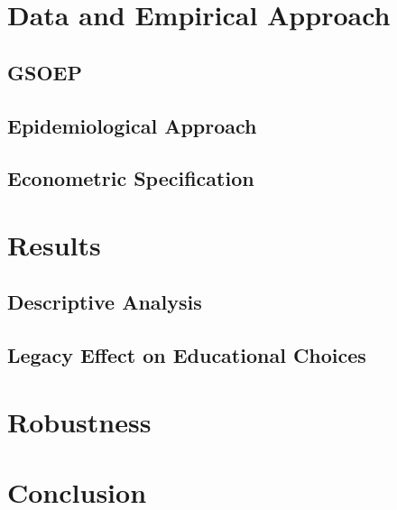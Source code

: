 \documentclass[a4paper, oneside, hyperfootnotes = false]{article}
\begin{document}
{\section{Data and Empirical Approach}
\label{dataemp}

\subsection{GSOEP}
\label{gsoep}

\subsection{Epidemiological Approach}
\label{epid}

\subsection{Econometric Specification}
\label{specification}

\section{Results}
\label{results}

\subsection{Descriptive Analysis}
\label{descriptives}

\subsection{Legacy Effect on Educational Choices}
\label{educational}

\section{Robustness}
\label{robustness}

\section{Conclusion}
\label{conclusion}


{}

\makeatletter %


\label{references}

\makeatother

\vspace{-.3cm}

\clearpage

}
\end{document}

